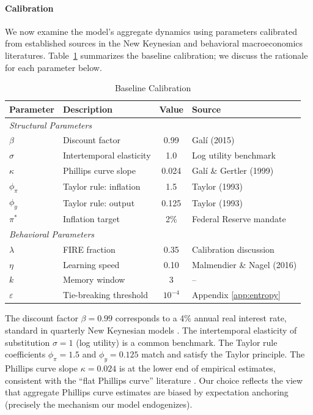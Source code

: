 \documentclass[10pt]{article}
\begin{document}
\paragraph{Calibration} We now examine the model's aggregate dynamics using parameters calibrated from established sources in the New Keynesian and behavioral macroeconomics literatures. Table~\ref{tab:calibration} summarizes the baseline calibration; we discuss the rationale for each parameter below.

\begin{table}[htbp]
\centering
\caption{Baseline Calibration}
\label{tab:calibration}
\begin{tabular}{llcl}
\hline
Parameter & Description & Value & Source \\
\hline
\multicolumn{4}{l}{\textit{Structural Parameters}} \\
$\beta$ & Discount factor & 0.99 & Gal\'i (2015) \\
$\sigma$ & Intertemporal elasticity & 1.0 & Log utility benchmark \\
$\kappa$ & Phillips curve slope & 0.024 & Gal\'i \& Gertler (1999) \\
$\phi_\pi$ & Taylor rule: inflation & 1.5 & Taylor (1993) \\
$\phi_y$ & Taylor rule: output & 0.125 & Taylor (1993) \\
$\pi^*$ & Inflation target & 2\% & Federal Reserve mandate \\
\hline
\multicolumn{4}{l}{\textit{Behavioral Parameters}} \\
$\lambda$ & FIRE fraction & 0.35 & Calibration discussion \\
$\eta$ & Learning speed & 0.10 & Malmendier \& Nagel (2016) \\
$k$ & Memory window & 3 & -- \\
$\varepsilon$ & Tie-breaking threshold & $10^{-4}$ & Appendix \ref{app:entropy} \\
\hline
\end{tabular}
\end{table}

The discount factor $\beta = 0.99$ corresponds to a 4\% annual real interest rate, standard in quarterly New Keynesian models \citep{gali2015monetary}. The intertemporal elasticity of substitution $\sigma = 1$ (log utility) is a common benchmark. The Taylor rule coefficients $\phi_\pi = 1.5$ and $\phi_y = 0.125$ match \citet{taylor1993discretion} and satisfy the Taylor principle. The Phillips curve slope $\kappa = 0.024$ is at the lower end of empirical estimates, consistent with the ``flat Phillips curve'' literature \citep{gali1999, hazell2022slope}. Our choice reflects the view that aggregate Phillips curve estimates are biased by expectation anchoring (precisely the mechanism our model endogenizes).
\end{document}
